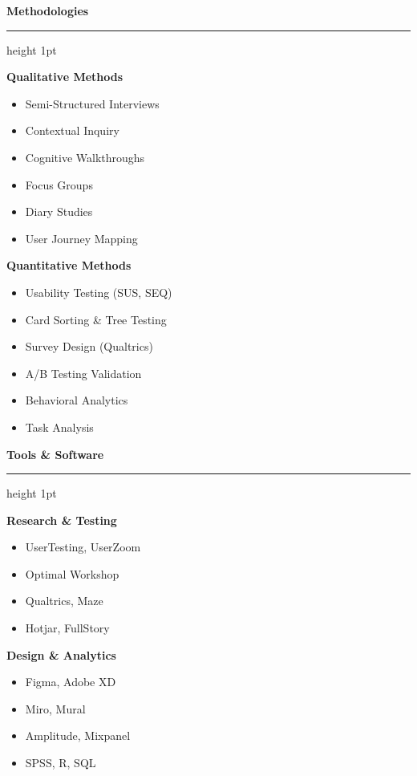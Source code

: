 \documentclass[10pt]{article}
\newcommand{\sidebarsubsection}[1]{%
  \vspace{4pt}%
  {\noindent\small\bfseries\color{primary} #1}%
  \vspace{1.5pt}%
}
\begin{document}
\begin{minipage}[t]{0.34\textwidth}
  \vspace{0pt}
  \begin{sidebarbox}
    {\large\bfseries\color{primary} Methodologies}
    \vspace{2pt}
    {\color{divider}\hrule height 1pt}
    \vspace{4pt}
    
    \sidebarsubsection{Qualitative Methods}
    \begin{itemize}
      \item Semi-Structured Interviews
      \item Contextual Inquiry
      \item Cognitive Walkthroughs
      \item Focus Groups
      \item Diary Studies
      \item User Journey Mapping
    \end{itemize}
    
    \sidebarsubsection{Quantitative Methods}
    \begin{itemize}
      \item Usability Testing (SUS, SEQ)
      \item Card Sorting \& Tree Testing
      \item Survey Design (Qualtrics)
      \item A/B Testing Validation
      \item Behavioral Analytics
      \item Task Analysis
    \end{itemize}
    
    \vspace{6pt}
    {\large\bfseries\color{primary} Tools \& Software}
    \vspace{2pt}
    {\color{divider}\hrule height 1pt}
    \vspace{4pt}
    
    \sidebarsubsection{Research \& Testing}
    \begin{itemize}
      \item UserTesting, UserZoom
      \item Optimal Workshop
      \item Qualtrics, Maze
      \item Hotjar, FullStory
    \end{itemize}
    
    \sidebarsubsection{Design \& Analytics}
    \begin{itemize}
      \item Figma, Adobe XD
      \item Miro, Mural
      \item Amplitude, Mixpanel
      \item SPSS, R, SQL
    \end{itemize}
    

\end{sidebarbox}
\end{minipage}
\end{document}
